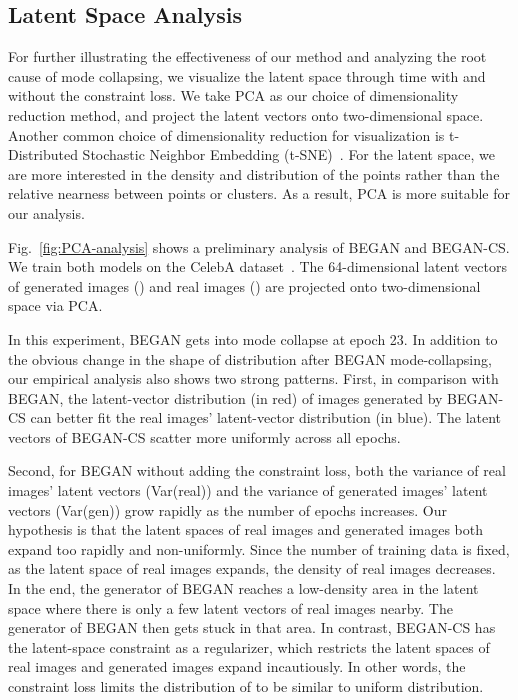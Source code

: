 \documentclass[runningheads]{llncs}
\begin{document}
    
    \subsection{Latent Space Analysis}
    \label{subsection:PCA-analysis}
    
    For further illustrating the effectiveness of our method and analyzing the root cause of mode collapsing, we visualize the latent space through time with and without the constraint loss. We take PCA as our choice of dimensionality reduction method, and project the latent vectors onto two-dimensional space. Another common choice of dimensionality reduction for visualization is t-Distributed Stochastic Neighbor Embedding (t-SNE)~\cite{t-SNE}. For the latent space, we are more interested in the density and distribution of the points rather than the relative nearness between points or clusters. As a result, PCA is more suitable for our analysis.
    
    Fig.~\ref{fig:PCA-analysis} shows a preliminary analysis of BEGAN and BEGAN-CS. We train both models on the CelebA dataset~\cite{CelebA}. The 64-dimensional latent vectors of generated images () and real images () are projected onto two-dimensional space via PCA. 
    
    In this experiment, BEGAN gets into mode collapse at epoch 23. In addition to the obvious change in the shape of distribution after BEGAN mode-collapsing, our empirical analysis also shows two strong patterns. First, in comparison with BEGAN, the latent-vector distribution (in red) of images generated by BEGAN-CS can better fit the real images' latent-vector distribution (in blue). The latent vectors of BEGAN-CS scatter more uniformly across all epochs. 
    
    Second, for BEGAN without adding the constraint loss, both the variance of real images' latent vectors (Var(real)) and the variance of generated images' latent vectors (Var(gen)) grow rapidly as the number of epochs increases. Our hypothesis is that the latent spaces of real images and generated images  both expand too rapidly and non-uniformly. Since the number of training data is fixed, as the latent space of real images expands, the density of real images decreases. In the end, the generator of BEGAN reaches a low-density area in the latent space where there is only a few latent vectors of real images nearby. The generator of BEGAN then gets stuck in that area. In contrast, BEGAN-CS has the latent-space constraint as a regularizer, which restricts the latent spaces of real images and generated images expand incautiously. In other words, the constraint loss limits the distribution of  to be similar to uniform distribution.
    
\end{document}

